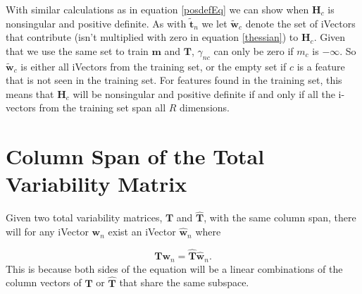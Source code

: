 With similar calculations as in equation \ref{posdefEq} we can show when $\mathbf{H}_c$ is nonsingular and positive definite. As with $\mathbf{\tilde{t}}_n$ we let $\mathbf{\tilde{w}}_c$ denote the set of iVectors that contribute (isn't multiplied with zero in equation \ref{thessian}) to $\mathbf{H}_c$. Given that we use the same set to train $\mathbf{m}$ and $\mathbf{T}$, $\gamma_{nc}$ can only be zero if $m_c$ is $-\infty$. So $\mathbf{\tilde{w}}_c$ is either all iVectors from the training set, or the empty set if $c$ is a feature that is not seen in the training set. For features found in the training set, this means that $\mathbf{H}_c$ will be nonsingular and positive definite if and only if all the i-vectors from the training set span all $R$ dimensions.

\section{Column Span of the Total Variability Matrix}
\label{sect:orthproof}

Given two total variability matrices, $\mathbf{T}$ and $\mathbf{\hat{T}}$, with the same column span, there will for any iVector $\mathbf{w}_n$ exist an iVector $\mathbf{\hat{w}}_n$ where 

\begin{equation}
\label{colpropEq}
\mathbf{Tw}_n = \mathbf{\hat{T}\hat{w}}_n.
\end{equation}
This is because both sides of the equation will be a linear combinations of the column vectors of $\mathbf{T}$ or $\mathbf{\hat{T}}$ that share the same subspace. 

